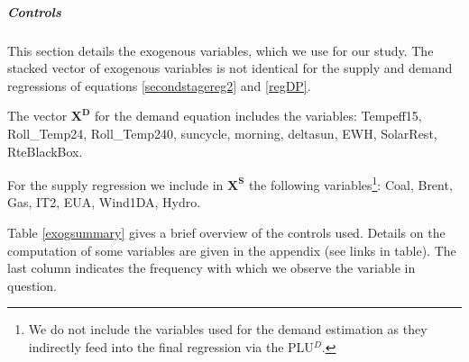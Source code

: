 


\subparagraph{Controls}
\label{controlssec}

This section details the exogenous variables, which we use for our study. The stacked vector of exogenous variables is not identical for the supply and demand regressions of equations \ref{secondstagereg2} and \ref{regDP}. 

The vector $\boldsymbol{X^D}$ for the demand equation includes the variables: Tempeff15, Roll\_Temp24, Roll\_Temp240, suncycle, morning, deltasun, EWH, SolarRest, RteBlackBox.

For the supply regression we include in $\boldsymbol{X^S}$ the following variables\footnote{We do not include the variables used for the demand estimation as they indirectly feed into the final regression via the PLU$^D$.}: 
Coal, Brent, Gas, IT2, EUA, Wind1DA, Hydro. 
 
Table \ref{exogsummary} gives a brief overview of the controls used. Details on the computation of some  variables are given in the appendix (see links in table). The last column indicates the frequency with which we observe the variable in question. 

